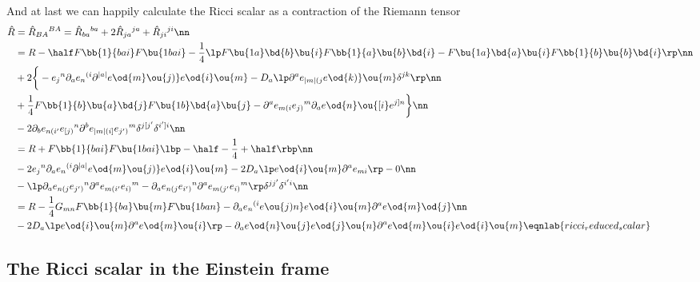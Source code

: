 And at last we can happily calculate the Ricci scalar as a contraction of the Riemann tensor
\begin{align}
\hat R &= \hat R{_{BA}}^{BA} = \hat R{_{ba}}^{ba} + 2\hat R{_{ja}}^{ja} + \hat R{_{ji}}^{ji}\nn\\
&= R - \half F\bb{1}{bai}F\bu{1bai} - \frac{1}{4}\lp F\bu{1a}\bd{b}\bu{i}F\bb{1}{a}\bu{b}\bd{i} - F\bu{1a}\bd{a}\bu{i}F\bb{1}{b}\bu{b}\bd{i} \rp\nn\\
& +2\bigg\{ 
-e{_{j}}^n\partial_{a}e{_n}^{(i}\partial^{|a|} e\od{m}\ou{j)}e\od{i}\ou{m}  
- D_{a}\lp\partial^{a} e_{|m|(j}e\od{k)}\ou{m}\delta^{jk}\rp\nn\\
& + \frac{1}{4} F\bb{1}{b}\bu{a}\bd{j}F\bu{1b}\bd{a}\bu{j} 
- \partial^a e_{m(i}e{_{j)}}^m\partial_{a} e\od{n}\ou{[i} e^{j]n}
\bigg\}\nn\\
&-2\partial_{b} e_{n(i'}e{_{[j)}}^n\partial^b e_{|m|(i]}e{_{j')}}^m\delta^{j[j'}\delta^{i']i}\nn\\
&= R + F\bb{1}{bai}F\bu{1bai}\lbp - \half - \frac{1}{4} + \half\rbp\nn\\
& -2e{_{j}}^n\partial_{a}e{_n}^{(i}\partial^{|a|} e\od{m}\ou{j)}e\od{i}\ou{m} - 2D_{a}\lp e\od{i}\ou{m}\partial^{a} e_{mi}\rp-0\nn\\
& - \lp \partial_{a} e_{n(j}e{_{j')}}^n\partial^a e_{m(i'}e{_{i)}}^m - \partial_{a} e_{n(j}e{_{i')}}^n\partial^a e_{m(j'}e{_{i)}}^m\rp\delta^{jj'}\delta^{i'i}\nn\\
&= R - \frac{1}{4} G_{mn}F\bb{1}{ba}\bu{m}F\bu{1ban} -\partial_{a}e{_n}^{(i}e\ou{j)n} e\od{i}\ou{m}\partial^{a} e\od{m}\od{j}\nn\\
&- 2D_{a}\lp e\od{i}\ou{m}\partial^{a} e\od{m}\ou{i}\rp
- \partial_{a} e\od{n}\ou{j}e\od{j}\ou{n}\partial^a e\od{m}\ou{i}e\od{i}\ou{m}
\eqnlab{ricci_reduced_scalar}
\end{align}

\subsection{The Ricci scalar in the Einstein frame}


